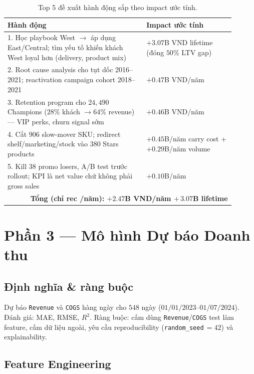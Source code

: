 \documentclass[10pt]{article}
\begin{document}
\begin{table}[h]
\centering
\footnotesize
\caption{Top 5 đề xuất hành động sắp theo impact ước tính.}
\label{tab:recs}
\begin{tabular}{p{0.55\linewidth}p{0.35\linewidth}}
\toprule
\textbf{Hành động} & \textbf{Impact ước tính} \\
\midrule
1. Học playbook West $\to$ áp dụng East/Central; tìm yếu tố khiến khách West loyal hơn (delivery, product mix) & $+3.07$B VND lifetime (đóng $50\%$ LTV gap) \\
2. Root cause analysis cho tụt dốc 2016--2021; reactivation campaign cohort 2018--2021 & $+0.47$B VND/năm \\
3. Retention program cho $24{,}490$ Champions ($28\%$ khách $\to 64\%$ revenue) --- VIP perks, churn signal sớm & $+0.46$B VND/năm \\
4. Cắt $906$ slow-mover SKU; redirect shelf/marketing/stock vào $380$ Stars products & $+0.45$B/năm carry cost + $+0.29$B/năm volume \\
5. Kill $38$ promo losers, A/B test trước rollout; KPI là net value chứ không phải gross sales & $+0.10$B/năm \\
\midrule
\multicolumn{2}{r}{\textbf{Tổng (chỉ rec /năm): $+2.47$B VND/năm $+\,3.07$B lifetime}} \\
\bottomrule
\end{tabular}
\end{table}

\section{Phần 3 --- Mô hình Dự báo Doanh thu}

\subsection{Định nghĩa \& ràng buộc}

Dự báo \texttt{Revenue} và \texttt{COGS} hàng ngày cho $548$ ngày ($01/01/2023$--$01/07/2024$). Đánh giá: MAE, RMSE, $R^2$. Ràng buộc: cấm dùng \texttt{Revenue}/\texttt{COGS} test làm feature, cấm dữ liệu ngoài, yêu cầu reproducibility (\texttt{random\_seed}\,$=42$) và explainability.

\subsection{Feature Engineering}
\end{document}
